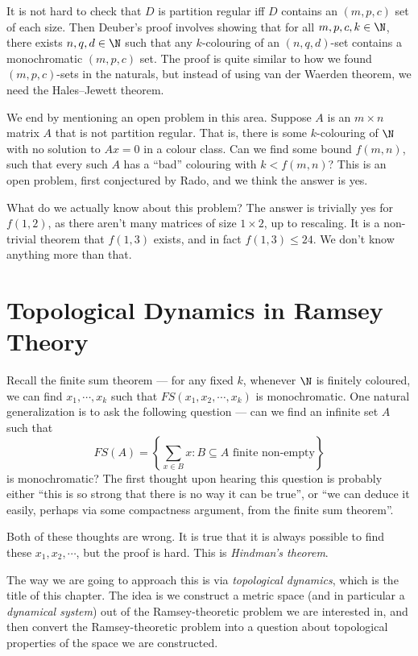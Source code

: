 \documentclass[a4paper]{article}
\begin{document}
It is not hard to check that $D$ is partition regular iff $D$ contains an $(m, p, c)$ set of each size. Then Deuber's proof involves showing that for all $m, p, c, k \in \N$, there exists $n, q, d \in \N $ such that any $k$-colouring of an $(n, q, d)$-set contains a monochromatic $(m, p, c)$ set. The proof is quite similar to how we found $(m, p, c)$-sets in the naturals, but instead of using van der Waerden theorem, we need the Hales--Jewett theorem.

\separator

We end by mentioning an open problem in this area. Suppose $A$ is an $m \times n $ matrix $A$ that is not partition regular. That is, there is some $k$-colouring of $\N$ with no solution to $Ax = 0$ in a colour class. Can we find some bound $f(m, n)$, such that every such $A$ has a ``bad'' colouring with $k < f(m, n)$? This is an open problem, first conjectured by Rado, and we think the answer is yes.

What do we actually know about this problem? The answer is trivially yes for $f(1, 2)$, as there aren't many matrices of size $1 \times 2$, up to rescaling. It is a non-trivial theorem that $f(1, 3)$ exists, and in fact $f(1, 3) \leq 24$. We don't know anything more than that.

\section{Topological Dynamics in Ramsey Theory}
Recall the finite sum theorem --- for any fixed $k$, whenever $\N$ is finitely coloured, we can find $x_1, \cdots, x_k$ such that $FS(x_1, x_2, \cdots, x_k)$ is monochromatic. One natural generalization is to ask the following question --- can we find an infinite set $A$ such that
\[
  FS(A) = \left\{\sum_{x \in B} x : B \subseteq A\text{ finite non-empty}\right\}
\]
is monochromatic? The first thought upon hearing this question is probably either ``this is so strong that there is no way it can be true'', or ``we can deduce it easily, perhaps via some compactness argument, from the finite sum theorem''.

Both of these thoughts are wrong. It is true that it is always possible to find these $x_1, x_2, \cdots$, but the proof is hard. This is \emph{Hindman's theorem}.

The way we are going to approach this is via \emph{topological dynamics}, which is the title of this chapter. The idea is we construct a metric space (and in particular a \emph{dynamical system}) out of the Ramsey-theoretic problem we are interested in, and then convert the Ramsey-theoretic problem into a question about topological properties of the space we are constructed.
\end{document}
